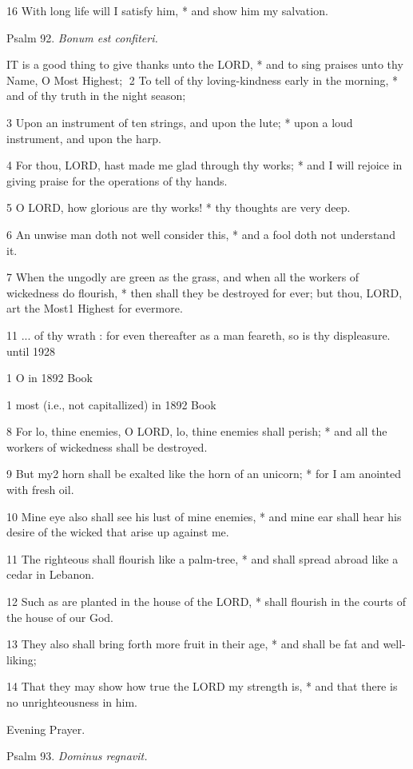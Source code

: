 16 With long life will I satisfy him, * and show him
my salvation.

Psalm
92. \emph{Bonum est confiteri.}

IT
is a good thing to give thanks unto the LORD, * and to sing praises unto
thy Name, O Most Highest; 2 To tell of thy loving-kindness
early in the morning, * and of thy truth in the night season;

3 Upon an instrument of ten strings, and upon the lute;
* upon a loud instrument, and upon the harp.

4 For thou, LORD, hast made me glad through thy works;
* and I will rejoice in giving praise for the operations of thy hands.

5 O LORD, how glorious are thy works! * thy thoughts
are very deep.

6 An unwise man doth not well consider this, * and
a fool doth not understand it.

7 When the ungodly are green as the grass, and when
all the workers of wickedness do flourish, * then shall they be destroyed
for ever; but thou, LORD, art the Most1 Highest for evermore.

11 ... of thy wrath : for
even thereafter as a man feareth, so is thy displeasure. until
1928 

1 O in
1892 Book

1 most
(i.e., not capitallized) in 1892 Book

8 For lo, thine enemies, O LORD, lo, thine enemies
shall perish; * and all the workers of wickedness shall be destroyed.

9 But my2 horn shall be exalted like the horn of an unicorn;
* for I am anointed with fresh oil.

10 Mine eye also shall see his lust of mine enemies,
* and mine ear shall hear his desire of the wicked that arise up against
me.

11 The righteous shall flourish like a palm-tree, *
and shall spread abroad like a cedar in Lebanon.

12 Such as are planted in the house of the LORD, *
shall flourish in the courts of the house of our God.

13 They also shall bring forth more fruit in their
age, * and shall be fat and well-liking;

14 That they may show how true the LORD my strength
is, * and that there is no unrighteousness in him. 

Evening
Prayer.

Psalm
93. \emph{Dominus regnavit.}

